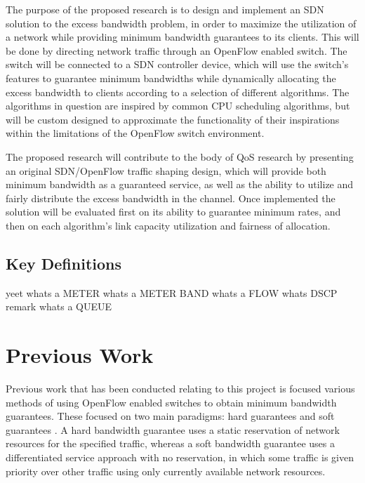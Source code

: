 \documentclass[accepted,single]{gipaper}
\begin{document}
The purpose of the proposed research is to design and implement an SDN solution to the excess bandwidth problem, in order to maximize the utilization of a network while providing minimum bandwidth guarantees to its clients. This will be done by directing network traffic through an OpenFlow enabled switch. The switch will be connected to a SDN controller device, which will use the switch's features to guarantee minimum bandwidths while dynamically allocating the excess bandwidth to clients according to a selection of different algorithms. The algorithms in question are inspired by common CPU scheduling algorithms, but will be custom designed to approximate the functionality of their inspirations within the limitations of the OpenFlow switch environment.

The proposed research will contribute to the body of QoS research by presenting an original SDN/OpenFlow traffic shaping design, which will provide both minimum bandwidth as a guaranteed service, as well as the ability to utilize and fairly distribute the excess bandwidth in the channel. Once implemented the solution will be evaluated first on its ability to guarantee minimum rates, and then on each algorithm's link capacity utilization and fairness of allocation.


\subsection{Key Definitions}
\label{definitions}

yeet whats a METER whats a METER BAND whats a FLOW whats DSCP remark whats a QUEUE

\section{Previous Work}
\label{prev_work}

Previous work that has been conducted relating to this project is focused various methods of using OpenFlow enabled switches to obtain minimum bandwidth guarantees. These focused on two main paradigms: hard guarantees and soft guarantees \cite{softqos}. A hard bandwidth guarantee uses a static reservation of network resources for the specified traffic, whereas a soft bandwidth guarantee uses a differentiated service approach with no reservation, in which some traffic is given priority over other traffic using only currently available network resources. 
\end{document}
